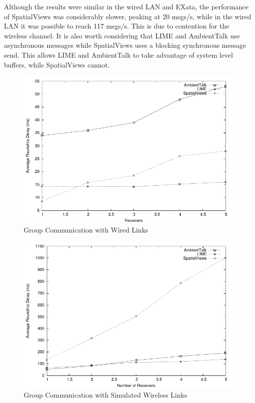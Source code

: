 Although the results were similar in the wired LAN and EXata, the performance of SpatialViews was considerably slower, peaking at 20 msgs/s, while in the wired LAN it was possible to reach 117 msgs/s. This is due to contention for the wireless channel. It is also worth considering that LIME and AmbientTalk use asynchronous messages while SpatialViews uses a blocking synchronous message send. This allows LIME and AmbientTalk to take advantage of system level buffers, while SpatialViews cannot.

\begin{figure}
\includegraphics[scale = .70]{figures/multicast-wired.pdf}
\caption{Group Communication with Wired Links}
\label{fig:multicast-wired}
\end{figure}

\begin{figure}
\includegraphics[scale = .70]{figures/multicast-qualnet.pdf}
\caption{Group Communication with Simulated Wireless Links}
\label{fig:multicast-qualnet}
\end{figure}


